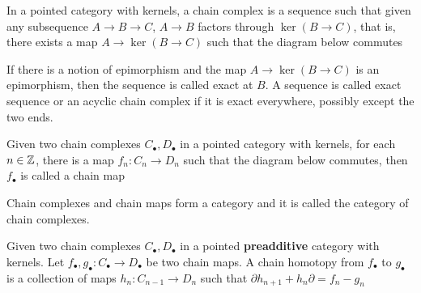 \documentclass{article}
\begin{document}
\begin{definition}
    In a pointed category with kernels, a chain complex is a sequence such that given any subsequence $A \to B \to C$, $A \to B$ factors through $\ker (B \to C)$, that is, there exists a map $A \to \ker (B \to C)$ such that the diagram below commutes
    \begin{center}
    \end{center}

    If there is a notion of epimorphism and the map $A \to \ker (B \to C)$ is an epimorphism, then the sequence is called exact at $B$. A sequence is called exact sequence or an acyclic chain complex if it is exact everywhere, possibly except the two ends.
\end{definition}

\begin{definition}
    Given two chain complexes $C_\bullet, D_\bullet$ in a pointed category with kernels, for each $n \in \mathbb{Z}$, there is a map $f_n: C_n \to D_n$ such that the diagram below commutes, then $f_\bullet$ is called a chain map
    \begin{center}
    \end{center}

    Chain complexes and chain maps form a category and it is called the category of chain complexes.

    Given two chain complexes $C_\bullet, D_\bullet$ in a pointed \textbf{preadditive} category with kernels. Let $f_\bullet, g_\bullet: C_\bullet \to D_\bullet$ be two chain maps. A chain homotopy from $f_\bullet$ to $g_\bullet$ is a collection of maps $h_n: C_{n-1} \to D_n$ such that $\partial h_{n+1} + h_n \partial = f_n - g_n$

    \begin{center}
    \end{center}
    
    
\end{definition}
\end{document}
